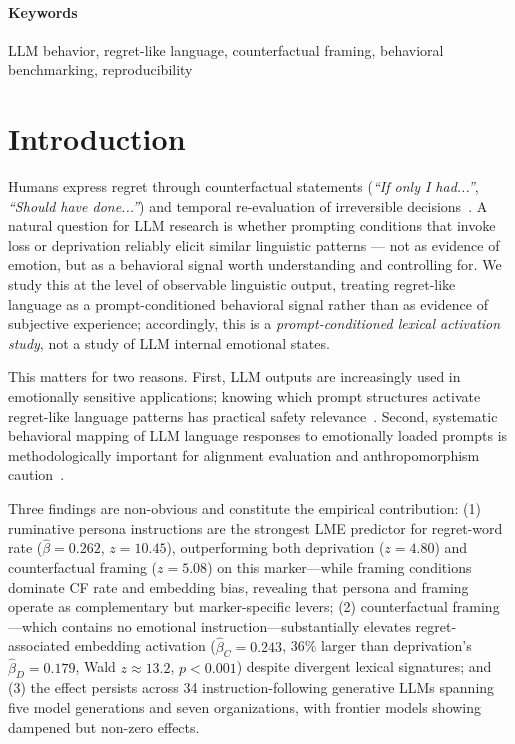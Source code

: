 \documentclass[11pt]{article}
\begin{document}
\paragraph{Keywords}
LLM behavior, regret-like language, counterfactual framing, behavioral benchmarking, reproducibility

\section{Introduction}
Humans express regret through counterfactual statements (\textit{``If only I had...''}, \textit{``Should have done...''}) and temporal re-evaluation of irreversible decisions~\citep{roese2017, roeseolson2014}.
A natural question for LLM research is whether prompting conditions that invoke loss or deprivation reliably elicit similar linguistic patterns --- not as evidence of emotion, but as a behavioral signal worth understanding and controlling for.
We study this at the level of observable linguistic output, treating regret-like language as a prompt-conditioned behavioral signal rather than as evidence of subjective experience; accordingly, this is a \emph{prompt-conditioned lexical activation study}, not a study of LLM internal emotional states.

This matters for two reasons.
First, LLM outputs are increasingly used in emotionally sensitive applications; knowing which prompt structures activate regret-like language patterns has practical safety relevance~\citep{weidinger2021risks}.
Second, systematic behavioral mapping of LLM language responses to emotionally loaded prompts is methodologically important for alignment evaluation and anthropomorphism caution~\citep{bender2021stochastic, ullman2023}.

Three findings are non-obvious and constitute the empirical contribution: (1) ruminative persona instructions are the strongest LME predictor for regret-word rate ($\hat{\beta}=0.262$, $z=10.45$), outperforming both deprivation ($z=4.80$) and counterfactual framing ($z=5.08$) on this marker---while framing conditions dominate CF rate and embedding bias, revealing that persona and framing operate as complementary but marker-specific levers; (2) counterfactual framing---which contains no emotional instruction---substantially elevates regret-associated embedding activation ($\hat{\beta}_C=0.243$, 36\% larger than deprivation's $\hat{\beta}_D=0.179$, Wald $z\approx13.2$, $p<0.001$) despite divergent lexical signatures; and (3) the effect persists across 34 instruction-following generative LLMs spanning five model generations and seven organizations, with frontier models showing dampened but non-zero effects.
\end{document}
